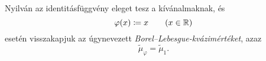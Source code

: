 \documentclass[
]{elteikthesis}[2024/04/26]
\begin{document}
	\begin{note}
		Nyilván az identitásfüggvény eleget tesz a kívánalmaknak, és
		\[
			\varphi(x) \coloneq x \qquad (x \in \mathbb{R})
		\]
		esetén visszakapjuk az úgynevezett \emph{Borel--Lebesgue-kvázimértéket}, azaz
		\[
			\widetilde{\mu}_\varphi = \widetilde{\mu}_1.
		\]
	\end{note}
	
	
\end{document}
